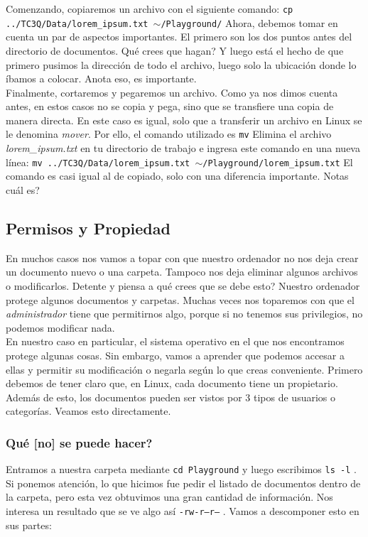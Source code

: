 \documentclass[10pt,letterpaper]{article}
\newcommand{\inlinecode}[1]{
\colorbox{light-gray}{\texttt{#1}}
}
\begin{document}
Comenzando, copiaremos un archivo con el siguiente comando: \inlinecode{cp ../TC3Q/Data/lorem\_ipsum.txt $\sim$/Playground/} Ahora, debemos tomar en cuenta un par de aspectos importantes. El primero son los dos puntos antes del directorio de documentos. Qu\'e crees que hagan? Y luego est\'a el hecho de que primero pusimos la direcci\'on de todo el archivo, luego solo la ubicaci\'on donde lo \'ibamos a colocar. Anota eso, es importante.\\

Finalmente, cortaremos y pegaremos un archivo. Como ya nos dimos cuenta antes, en estos casos no se copia y pega, sino que se transfiere una copia de manera directa. En este caso es igual, solo que a transferir un archivo en Linux se le denomina \emph{mover}. Por ello, el comando utilizado es \inlinecode{mv} Elimina el archivo \emph{lorem\_ipsum.txt} en tu directorio de trabajo e ingresa este comando en una nueva l\'inea: \inlinecode{mv ../TC3Q/Data/lorem\_ipsum.txt $ \sim $/Playground/lorem\_ipsum.txt} El comando es casi igual al de copiado, solo con una diferencia importante. Notas cu\'al es?

\subsection{Permisos y Propiedad}
En muchos casos nos vamos a topar con que nuestro ordenador no nos deja crear un documento nuevo o una carpeta. Tampoco nos deja eliminar algunos archivos o modificarlos. Detente y piensa a qu\'e crees que se debe esto? Nuestro ordenador protege algunos documentos y carpetas. Muchas veces nos toparemos con que el \emph{administrador} tiene que permitirnos algo, porque si no tenemos sus privilegios, no podemos modificar nada.\\

En nuestro caso en particular, el sistema operativo en el que nos encontramos protege algunas cosas. Sin embargo, vamos a aprender que podemos accesar a ellas y permitir su modificaci\'on o negarla seg\'un lo que creas conveniente. Primero debemos de tener claro que, en Linux, cada documento tiene un propietario. Adem\'as de esto, los documentos pueden ser vistos por 3 tipos de usuarios o categor\'ias. Veamos esto directamente.

\subsubsection{Qu\'e [no] se puede hacer?}
Entramos a nuestra carpeta mediante \inlinecode{cd Playground} y luego escribimos \inlinecode{ls -l}. Si ponemos atenci\'on, lo que hicimos fue pedir el listado de documentos dentro de la carpeta, pero esta vez obtuvimos una gran cantidad de informaci\'on. Nos interesa un resultado que se ve algo as\'i \inlinecode{-rw-r--r--}. Vamos a descomponer esto en sus partes:
\end{document}
